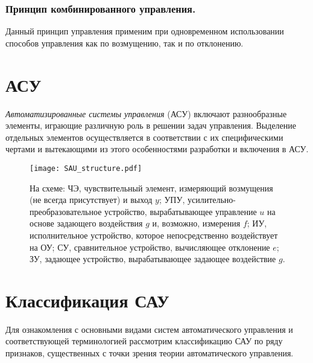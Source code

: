 \documentclass[../../TAU.tex]{subfiles}
\begin{document}

\subsubsection{Принцип комбинированного управления.}
    Данный принцип управления применим при одновременном использовании способов управления как по возмущению, так и по отклонению.

\section{АСУ}

    {\it Автоматизированные системы управления} (АСУ) включают разнообразные элементы, играющие различную роль в решении задач управления. Выделение отдельных элементов осуществляется в соответствии с их специфическими чертами и вытекающими из этого особенностями разработки и включения в АСУ. 

    \begin{figure}[h]
    \centering
    \texttt{[image: SAU\_structure.pdf]}
    \caption{На схеме: 
    ЧЭ, чувствительный элемент, измеряющий возмущения (не всегда присутствует)
     и выход $y$; УПУ, усилительно-преобразовательное устройство, вырабатывающее управление $u$ на основе задающего воздействия $g$ и, возможно, измерения $f$; ИУ, исполнительное устройство, которое непосредственно воздействует на ОУ; СУ, сравнительное устройство, вычисляющее отклонение $e$; ЗУ, задающее устройство, вырабатывающее задающее воздействие $g$.}
    \centering
    \end{figure}


\section{Классификация САУ}
    Для ознакомления с основными видами систем автоматического управления и соответствующей терминологией рассмотрим классификацию САУ по ряду признаков, существенных с точки зрения теории автоматического управления. 
\end{document}
